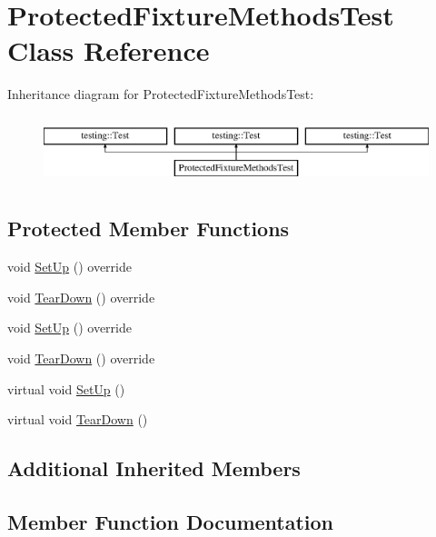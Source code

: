 \hypertarget{class_protected_fixture_methods_test}{}\section{Protected\+Fixture\+Methods\+Test Class Reference}
\label{class_protected_fixture_methods_test}
Inheritance diagram for Protected\+Fixture\+Methods\+Test\+:\begin{figure}[H]
\begin{center}
\leavevmode
\includegraphics[height=2.000000cm]{d1/dcc/class_protected_fixture_methods_test}
\end{center}
\end{figure}
\subsection*{Protected Member Functions}
\begin{DoxyCompactItemize}
\item 
void \mbox{\hyperlink{class_protected_fixture_methods_test_a9d68d51c945c3f810cc2ab76e71ecb95}{Set\+Up}} () override
\item 
void \mbox{\hyperlink{class_protected_fixture_methods_test_a826369510d499ffcab66649f7315e8cd}{Tear\+Down}} () override
\item 
void \mbox{\hyperlink{class_protected_fixture_methods_test_a9d68d51c945c3f810cc2ab76e71ecb95}{Set\+Up}} () override
\item 
void \mbox{\hyperlink{class_protected_fixture_methods_test_a826369510d499ffcab66649f7315e8cd}{Tear\+Down}} () override
\item 
virtual void \mbox{\hyperlink{class_protected_fixture_methods_test_a5184c708ac89cfb69f0e4c742e93398a}{Set\+Up}} ()
\item 
virtual void \mbox{\hyperlink{class_protected_fixture_methods_test_aa143dff0a99903cde207b6fd0042c03c}{Tear\+Down}} ()
\end{DoxyCompactItemize}
\subsection*{Additional Inherited Members}


\subsection{Member Function Documentation}
\mbox{\label{class_protected_fixture_methods_test_a9d68d51c945c3f810cc2ab76e71ecb95}} 
